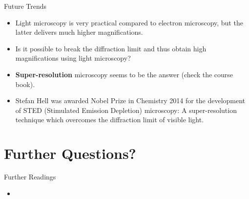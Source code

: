 \begin{frame}[c]{Future Trends}
	\begin{itemize}
		\setlength\itemsep{0.4cm}
		\item<1-> Light microscopy is very practical compared to electron microscopy, but the latter delivers much higher magnifications.
		\item<2-> Is it possible to break the diffraction limit and thus obtain high magnifications using light microscopy?
		\item<3-> \textbf{Super-resolution} microscopy seems to be the answer (check the course book).
		\item<4-> Stefan Hell was awarded Nobel Prize in Chemistry 2014 for the development of STED (Stimulated Emission Depletion) microscopy: A super-resolution technique which overcomes the diffraction limit of visible light.
	\end{itemize}
\end{frame}




\section{Further Questions?}

\begin{frame}[t]{Further Readings}
	\begin{itemize}
		\item {}
	\end{itemize}

\end{frame}





